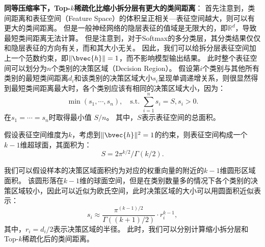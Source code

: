 \textbf{同等压缩率下，Top-$k$稀疏化比缩小拆分层有更大的类间距离}：
首先注意到，类间距离和表征空间（Feature Space）的体积呈正相关---表征空间越大，则可以有更大的类间距离。
%
但是一般神经网络的隐层表征的值域是无限大的，即$\mathbb R^d$，导致最短类间距离无法计算。
%
但是注意到，对于Softmax的多分类层，其分类结果仅仅和隐层表征的方向有关，而和其大小无关。
%
因此，我们可以给拆分层表征空间加上一个范数约束，即$\Vert \bvec{h} \Vert = 1$，而不影响模型输出结果。
%
此时整个表征空间可以划分为$n$个类别的决策区域（Decision Region）。
假设第$i$个类别与其他所有类别的最短类间距离$d_i$和该类别的决策区域大小$s_i$呈现单调递增关系，则很显然得到最短类间距离最大时，各个类别应该有相同的决策区域大小，因为：
\begin{equation}
    \min (s_1, \cdots, s_n), \quad \text{s.t. } {\sum_{i=1}^n s_i = S, s_i > 0}.
\end{equation}
在$s_1 = \cdots = s_n$时取得最小值 $S/n$。
其中，$S$表示表征空间的总面积。

假设表征空间维度为$k$，考虑到$\Vert \bvec{h} \Vert^2 = 1$的约束，则表征空间构成一个$k-1$维超球面，其面积为：
\begin{equation}
    S = 2\pi^{k/2}/\Gamma(k/2).
\end{equation}



我们可以假设样本的决策区域面积约为对应的权重向量的附近的$k-1$维圆形区域面积。
该圆形落在$k-1$维的球面空间，但是在类别数量多的情况下各个类别的决策区域较小，因此可以近似为欧氏空间，此时决策区域的大小可以用圆面积近似表示：
\begin{equation}
    s_i \approx \dfrac{\pi^{(k-1)/2}}{\Gamma((k+1)/2)} \cdot r_i^{k-1},
\end{equation}
其中，$r_i = d_i/2$表示决策区域的半径。
%
此时，我们可以分别计算缩小拆分层和Top-$k$稀疏化后的类间距离。



